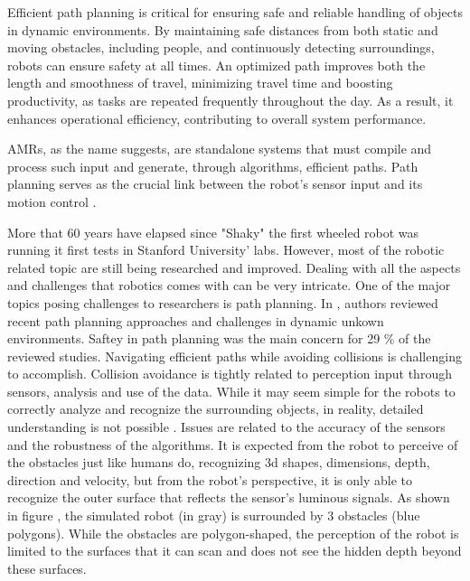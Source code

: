 Efficient path planning is critical for ensuring safe and reliable handling of objects in dynamic environments. 
By maintaining safe distances from both static and moving obstacles, including people, and continuously detecting 
surroundings, robots can ensure safety at all times. An optimized path improves both the length and 
smoothness of travel, minimizing travel time and boosting productivity, as tasks are repeated frequently 
throughout the day. As a result, it enhances operational efficiency, contributing to overall system 
performance.

AMRs, as the name suggests, are 
standalone systems that must compile and process such input and generate, through algorithms, 
efficient paths. Path planning serves as the crucial 
link between the robot’s sensor input and its motion control \cite{R10}.


More that 60 years have elapsed since "Shaky" the first wheeled robot was running it first tests
in Stanford University' labs. However, most of the robotic related topic are still being researched and improved.
Dealing with all the aspects and challenges that robotics comes with can be very intricate. One of the major 
topics posing challenges to researchers is path planning. 
In \cite{R20}, authors reviewed recent path planning approaches and challenges
in dynamic unkown environments. 
Saftey in path planning was the main concern for 29 \% of the reviewed studies. Navigating efficient 
paths while avoiding collisions is challenging to accomplish. Collision avoidance is tightly related to perception 
input through sensors, analysis and use of the data. While it may seem simple for the robots to correctly analyze 
and recognize the surrounding objects, in reality, detailed understanding is not possible \cite{R21}. Issues are 
related to the accuracy of the sensors and the robustness of the algorithms. 
It is expected from the robot to 
perceive of the obstacles just like humans do, recognizing 3d shapes, dimensions, depth, direction and velocity, 
but from the 
robot's perspective, it is only able to recognize the outer surface that reflects the sensor's luminous signals. As shown in
figure , the simulated robot (in gray) is surrounded by 3 obstacles (blue polygons).
While the obstacles are polygon-shaped, the perception of the robot is limited to the surfaces that 
it can scan and does not see the hidden depth beyond these surfaces.

